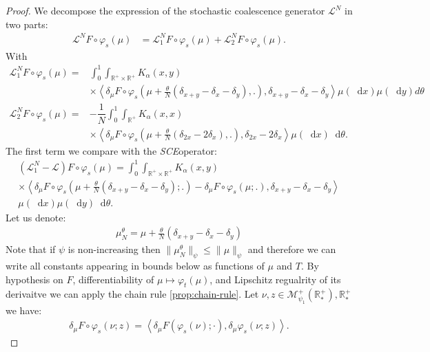 \documentclass[11pt,a4paper]{article}
\newcommand{\RR}{\mathbb{R}}
\newcommand{\RRP}{\mathbb{R}^+_*}
\newcommand{\MC}{\mathcal{M}}
\newcommand{\LC}{\mathcal{L}}
\newcommand{\SCE}{\emph{SCE}}
\newcommand{\brac}[1]{\left\langle#1\right\rangle}
\newcommand{\dd}{\mathop{}\!\mathrm{d}}
\begin{document}
\begin{proof}
    We decompose the expression of the stochastic coalescence generator $\LC^N$ in two parts:
    \begin{align*}
        \LC^N F\circ \varphi_s(\mu) &= \LC_1^N F\circ \varphi_s(\mu) + \LC_2^N F\circ \varphi_s(\mu).
    \end{align*}
    With
    \begin{align*}
            \LC_1^N F\circ \varphi_s(\mu) =& \int_0^1 \int_{\RR^+ \times \RR^+} K_{\alpha}(x,y) \\
            &\times \left\langle  \delta_\mu F\circ \varphi_s\left(\mu + \frac{\theta}{N}\left(\delta_{x + y} - \delta_x - \delta_y \right),.\right),\delta_{x+y} - \delta_x - \delta_y\right\rangle\mu(\dd x)\mu(\dd y)d\theta \\
            \LC_2^N F\circ \varphi_s(\mu) =& -\dfrac{1}{N}\int_0^1\int_{\RR^+} K_{\alpha}(x,x) \\
            &\times \left\langle  \delta_\mu F\circ \varphi_s\left(\mu + \frac{\theta}{N}\left(\delta_{2x} - 2\delta_x \right),.\right),\delta_{2x} - 2\delta_x \right\rangle\mu(\dd x)\dd\theta.
    \end{align*}
    The first term we compare with the \SCE operator:
    \begin{multline*}
        \left(\LC_1^N - \LC\right)F\circ \varphi_s (\mu) 
        = \int_0^1 \int_{\RR^+ \times \RR^+} K_{\alpha}(x,y)\\
        \times  \left\langle  \delta_\mu F\circ \varphi_s\left(\mu + \frac{\theta}{N}\left(\delta_{x + y} - \delta_x - \delta_y \right);.\right)- \delta_\mu F\circ \varphi_s\left(\mu;.\right),\delta_{x+y} - \delta_x - \delta_y\right\rangle \\
        \mu(\dd x)\mu(\dd y)\dd \theta .
    \end{multline*}
    Let us denote:
    \begin{align*}
        \mu^\theta_N = \mu + \frac{\theta}{N}\left(\delta_{x + y} - \delta_x - \delta_y \right)
    \end{align*}
    Note that if $\psi$ is non-increasing then $\|\mu^\theta_N\|_{\psi} \leq \|\mu\|_{\psi}$ and therefore we can write all constants appearing in bounds below as functions of $\mu$ and $T$. By hypothesis on $F$, differentiability of $\mu \mapsto \varphi_t(\mu)$, and Lipschitz regualrity of its derivaitve we can apply the chain rule \ref{prop:chain-rule}. Let $\nu,z \in \MC^+_{\psi_1}(\RRP),\RRP$ we have:
    \begin{align*}
        \delta_\mu F\circ \varphi_s(\nu;z) = \brac{\delta_\mu F(\varphi_s(\nu);\cdot),\delta_\mu \varphi_s (\nu;z)}.

\end{align*}
\end{proof}
\end{document}
